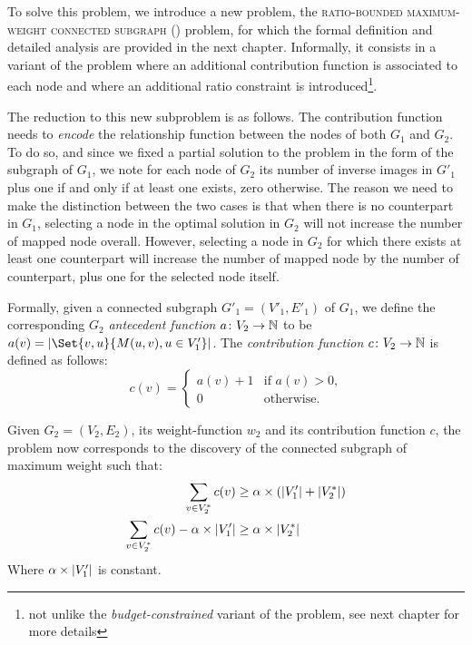 			To solve this problem, we introduce a new problem, the \textsc{ratio-bounded maximum-weight connected subgraph} (\rbmwcs) problem, for which the formal definition and detailed analysis are provided in the next chapter.
			Informally, it consists in a variant of the \mwcs{} problem where an additional contribution function is associated to each node and where an additional ratio constraint is introduced\footnote{not unlike the \emph{budget-constrained} variant of the \mwcs{} problem, see next chapter for more details}.

			The reduction to this new subproblem is as follows.
			The contribution function needs to \emph{encode} the relationship function between the nodes of both $G_1$ and $G_2$.
			To do so, and since we fixed a partial solution to the problem in the form of the subgraph of $G_1$, we note for each node of $G_2$ its number of inverse images in $G'_1$ plus one if and only if at least one exists, zero otherwise.
			The reason we need to make the distinction between the two cases is that when there is no counterpart in $G_1$, selecting a node in the optimal solution in $G_2$ will not increase the number of mapped node overall.
			However, selecting a node in $G_2$ for which there exists at least one counterpart will increase the number of mapped node by the number of counterpart, plus one for the selected node itself.

			Formally, given a connected subgraph $G'_1=(V'_1,E'_1)$ of $G_1$, we define the corresponding $G_2$ \emph{antecedent function} $a\colon V_2 \to \mathbb{N}$ to be $a(v)=\card{\Set{v,u}{M(u,v), u\in V'_1}}$.
			The \emph{contribution function} $c\colon V_2 \to \mathbb{N}$ is defined as follows:
			$$c(v)=\begin{cases}a(v) + 1 &\mbox{if }a(v) > 0\mbox{,} \\
		                       0        &\mbox{otherwise.}
		          \end{cases}$$

			Given $G_2=(V_2,E_2)$, its weight-function $w_2$ and its contribution function $c$, the problem now corresponds to the discovery of the connected subgraph of maximum weight such that:
			\begin{align*}
				\sum_{v \in V^*_2}{c(v)}                           &\geq \alpha\times\left(\lvert V'_1\rvert + \lvert V^*_2\rvert\right) \\
				\sum_{v \in V^*_2}{c(v)} - \alpha\times\lvert V'_1\rvert &\geq \alpha\times\lvert V^*_2\rvert
			\end{align*}
			Where $\alpha\times\lvert V_1'\rvert$ is constant.

